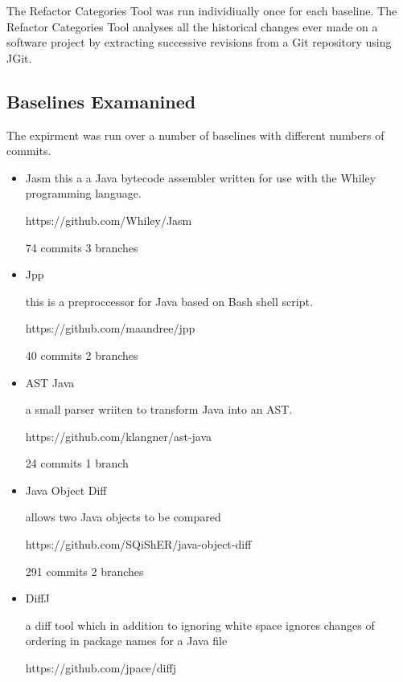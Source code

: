 The Refactor Categories Tool was run individiually once for each baseline.  The Refactor Categories Tool analyses all the historical changes ever made on a software project by extracting successive revisions from a Git repository using JGit.

\subsection{Baselines Examanined}
 The expirment was run over a number of baselines with different numbers of commits.
 
  \begin{itemize}
  \item Jasm
  this a a Java bytecode assembler written for use with the Whiley programming language.
  
  https://github.com/Whiley/Jasm
  
  74 commits 3 branches
  
  \item Jpp
  
  this is a preproccessor for Java based on Bash shell script. 
  
  https://github.com/maandree/jpp
  
  40 commits 2 branches
  
  \item AST Java
  
  a small parser wriiten to transform Java into an AST. 
  
  https://github.com/klangner/ast-java
  
  24 commits 1 branch
  
  \item Java Object Diff
  
  allows two Java objects to be compared 
  
  https://github.com/SQiShER/java-object-diff
  
  291 commits 2 branches
  
  \item DiffJ
  
  a diff tool which in addition to ignoring white space ignores changes of ordering in package names for a Java file 
  
  https://github.com/jpace/diffj
  

\end{itemize}
